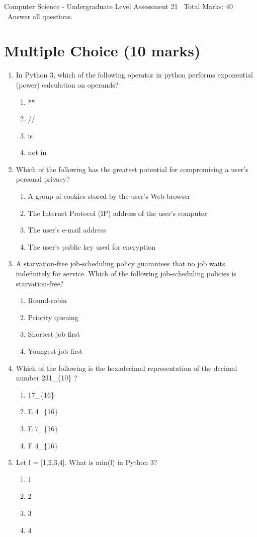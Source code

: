 \documentclass[12pt]{article}
\begin{document}
\begin{center}
Computer Science - Undergraduate Level Assessment 21 \
Total Marks: 40 \
Answer all questions.
\end{center}

\section*{Multiple Choice (10 marks)}
\begin{enumerate}[label=\arabic*.]
\item In Python 3, which of the following operator in python performs exponential (power) calculation on operands?
\begin{enumerate}[label=(\alph*)]
    \item **
    \item //
    \item is
    \item not in
\end{enumerate}
\item Which of the following has the greatest potential for compromising a user's personal privacy?
\begin{enumerate}[label=(\alph*)]
    \item A group of cookies stored by the user's Web browser
    \item The Internet Protocol (IP) address of the user's computer
    \item The user's e-mail address
    \item The user's public key used for encryption
\end{enumerate}
\item A starvation-free job-scheduling policy guarantees that no job waits indefinitely for service. Which of the following job-scheduling policies is starvation-free?
\begin{enumerate}[label=(\alph*)]
    \item Round-robin
    \item Priority queuing
    \item Shortest job first
    \item Youngest job first
\end{enumerate}
\item Which of the following is the hexadecimal representation of the decimal number 231\_\{10\} ?
\begin{enumerate}[label=(\alph*)]
    \item 17\_\{16\}
    \item E 4\_\{16\}
    \item E 7\_\{16\}
    \item F 4\_\{16\}
\end{enumerate}
\item Let l = [1,2,3,4]. What is min(l) in Python 3?
\begin{enumerate}[label=(\alph*)]
    \item 1
    \item 2
    \item 3
    \item 4
\end{enumerate}
\end{enumerate}
\end{document}
